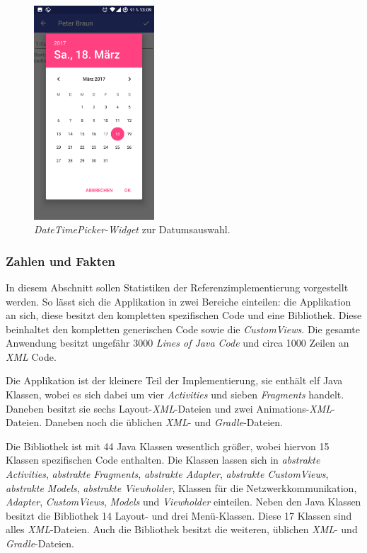 \begin{figure}[H]
	\begin{center}
		\includegraphics[width=0.4\textwidth]{images/date.png}
		\caption{\textit{DateTimePicker-Widget} zur Datumsauswahl.}
		\label{fig:date}
	\end{center}
\end{figure}

\subsubsection{Zahlen und Fakten}
In diesem Abschnitt sollen Statistiken der Referenzimplementierung vorgestellt werden. So lässt sich die Applikation in zwei Bereiche einteilen: die Applikation an sich, diese besitzt den kompletten spezifischen Code und eine Bibliothek. Diese beinhaltet den kompletten generischen Code sowie die \textit{CustomViews}. Die gesamte Anwendung besitzt ungefähr 3000 \textit{Lines of Java Code} und circa 1000 Zeilen an \textit{XML} Code. 

Die Applikation ist der kleinere Teil der Implementierung, sie enthält elf Java Klassen, wobei es sich dabei um vier \textit{Activities} und sieben \textit{Fragments} handelt. Daneben besitzt sie sechs Layout-\textit{XML}-Dateien und zwei Animations-\textit{XML}-Dateien. Daneben noch die üblichen \textit{XML}- und \textit{Gradle}-Dateien.

Die Bibliothek ist mit 44 Java Klassen wesentlich größer, wobei hiervon 15 Klassen spezifischen Code enthalten. Die Klassen lassen sich in \textit{abstrakte Activities}, \textit{abstrakte Fragments}, \textit{abstrakte Adapter}, \textit{abstrakte CustomViews}, \textit{abstrakte Models}, \textit{abstrakte Viewholder},  Klassen für die Netzwerkkommunikation, \textit{Adapter}, \textit{CustomViews}, \textit{Models} und \textit{Viewholder} einteilen. Neben den Java Klassen besitzt die Bibliothek 14 Layout- und drei Menü-Klassen. Diese 17 Klassen sind alles \textit{XML}-Dateien. Auch die Bibliothek besitzt die weiteren, üblichen \textit{XML}- und \textit{Gradle}-Dateien.

